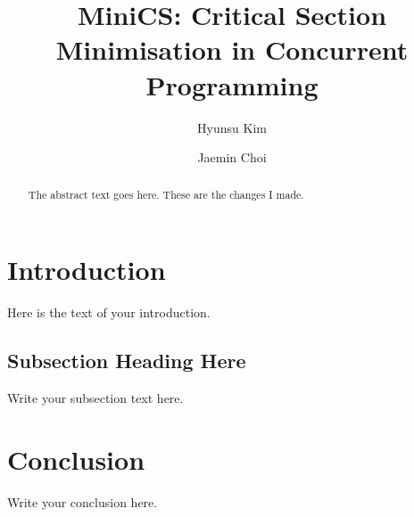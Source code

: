 \documentclass[sigchi]{acmart}
\begin{document}
\title{MiniCS: Critical Section Minimisation in Concurrent Programming}
\author{Hyunsu Kim}

\author{Jaemin Choi}


\begin{abstract}
The abstract text goes here. These are the changes I made.
\end{abstract}

\maketitle

\section{Introduction}
Here is the text of your introduction.

\subsection{Subsection Heading Here}
Write your subsection text here.

\section{Conclusion}
Write your conclusion here.
\end{document}
